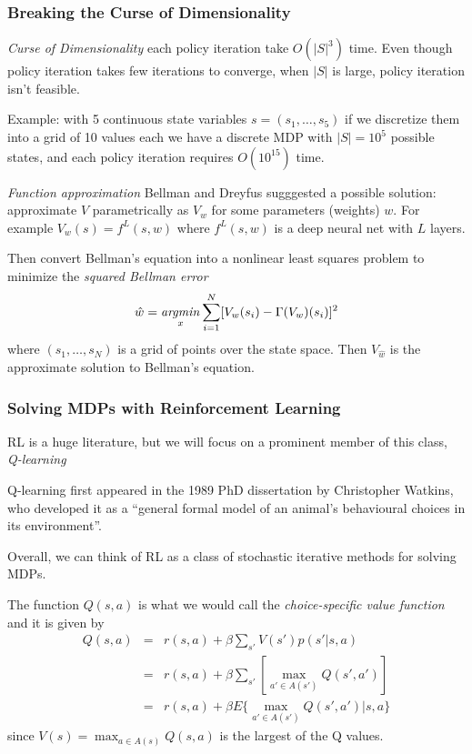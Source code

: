 \documentclass[10pt,english,t,handout]{beamer}
\begin{document}
\begin{frame} \frametitle{Breaking the Curse of Dimensionality}
\bi 
\item {\it Curse of Dimensionality}  each policy iteration take $O(|S|^3)$ time. Even though 
policy iteration takes few iterations to converge, when $|S|$ is large,  policy iteration isn't feasible.
\item Example: with 5 continuous state variables $s=(s_1,\ldots,s_5)$ if we discretize them into a grid of 10 values each
we have a discrete MDP with $|S|=10^5$ possible states, and each policy iteration requires $O(10^{15})$ time.
\item {\it Function approximation} Bellman and Dreyfus sugggested a possible solution: approximate $V$ parametrically
as $V_w$ for some parameters (weights) $w$.  For example $V_w(s)=f^L(s,w)$ where $f^L(s,w)$ is a deep neural net with $L$ layers.
\item Then convert Bellman's equation into a nonlinear least squares problem to minimize the {\it squared Bellman error\/}
$$    \hat w=\mathop{\it argmin}_x  \sum_{i=1}^N [V_w(s_i)-\Gamma(V_w)(s_i)]^2   $$
where $(s_1,\ldots,s_N)$ is a grid of points over the state space. Then  $V_{\hat w}$ is the approximate solution
to Bellman's equation.
\ei
\end{frame}

\begin{frame} \frametitle{Solving MDPs with Reinforcement Learning}
\bi
\item RL is a huge literature, but we will focus on a prominent member of this class, {\it Q-learning\/}
\item Q-learning first appeared in the 1989 PhD dissertation by Christopher Watkins, who developed it 
as a ``general formal model of an animal's behavioural choices in its environment''. 
\item Overall, we can think of RL as a class of stochastic iterative methods for solving MDPs. 
\item The function $Q(s,a)$ is what we would call the {\it choice-specific value function\/} and it is given by
\begin{eqnarray*} Q(s,a) &=& r(s,a) +\beta \sum_{s'} V(s')p(s'|s,a) \\
               & =& r(s,a)+\beta \sum_{s'} \left[ \max_{a' \in A(s')} Q(s',a') \right] \\
               & = & r(s,a)+\beta E\{ \max_{a' \in A(s')} Q(s',a')|s,a\}
 \end{eqnarray*}
since $V(s)=\max_{a \in A(s)} Q(s,a)$ is the largest of the Q values.
\ei
\end{frame}
\end{document}
